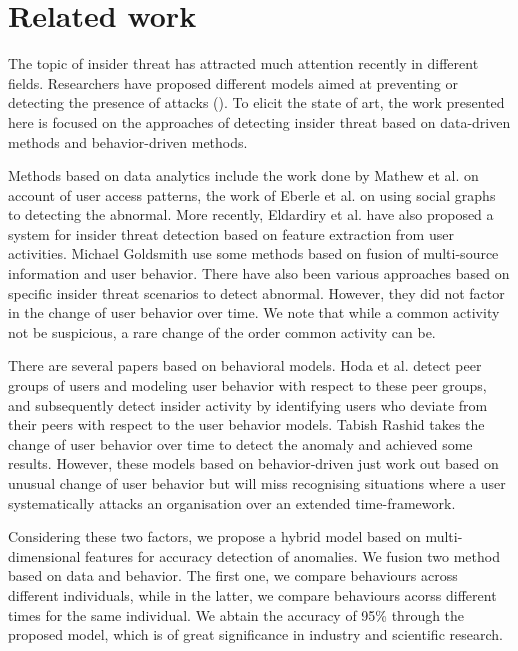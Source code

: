 \documentclass[conference]{IEEEtran}
\begin{document}
\section{Related work}
The topic of insider threat has attracted much attention recently in different fields. Researchers have proposed different models aimed at preventing or detecting the presence of attacks (\cite{b11}\cite{b12}). To elicit the state of art, the work
presented here is focused on the approaches of detecting  insider threat based on data-driven methods and behavior-driven methods.

Methods based on data analytics include the work done by Mathew et al.\cite{b13} on account of user access patterns, the work of Eberle et al. \cite{b14} on using social graphs to detecting the abnormal. More recently, Eldardiry et al. \cite{b15} have also proposed a system for insider threat detection based on feature extraction from user activities. Michael Goldsmith use some methods based on fusion of multi-source information and user behavior\cite{b16}. There have also been various approaches based on specific insider threat scenarios to detect abnormal\cite{b7}\cite{b8}. 
However, they did not factor in the change of user behavior over time. We note that while a common activity not be suspicious, a rare change of the order  common activity can be.

There are several papers based on behavioral models\cite{b10}\cite{b11}\cite{b12}. Hoda et al. \cite{b13}detect peer groups of users and modeling user behavior with respect to these peer groups, and subsequently detect insider activity by identifying users who deviate from their peers with respect to the user behavior models. 
Tabish Rashid \cite{b37} takes the change of user behavior  over time to detect the anomaly and achieved some results. However, these models based on behavior-driven just work out based on unusual change of user behavior but will miss recognising situations where a user systematically attacks an
organisation over an extended time-framework.

Considering these two factors, we propose 
a hybrid model based on multi-dimensional features for accuracy detection of anomalies.
We fusion two method based on data and behavior.
The first one, we compare behaviours across different individuals, while in the latter, we compare behaviours acorss different times for the same individual.  
We abtain the accuracy of 95\% through the proposed model, which is of great significance in industry and scientific research.
\end{document}
